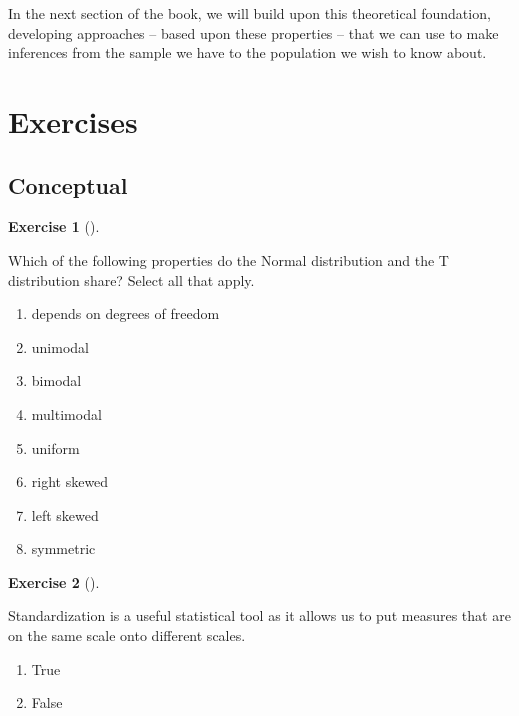 \documentclass[
  letterpaper,
  DIV=11,
  numbers=noendperiod]{scrreprt}
\providecommand{\tightlist}{%
  \setlength{\itemsep}{0pt}\setlength{\parskip}{0pt}}\usepackage{longtable,booktabs,array}
\theoremstyle{definition}
\newtheorem{exercise}{Exercise}[chapter]
\theoremstyle{remark}
\begin{document}
In the next section of the book, we will build upon this theoretical
foundation, developing approaches -- based upon these properties -- that
we can use to make inferences from the sample we have to the population
we wish to know about.

\hypertarget{sec-ex09}{%
\section{Exercises}\label{sec-ex09}}

\hypertarget{sec-ex09-conceptual}{%
\subsection{Conceptual}\label{sec-ex09-conceptual}}

\begin{exercise}[]\protect\hypertarget{exr-ch09-c01}{}\label{exr-ch09-c01}

Which of the following properties do the Normal distribution and the T
distribution share? Select all that apply.

\begin{enumerate}
\def\labelenumi{\alph{enumi})}
\tightlist
\item
  depends on degrees of freedom
\item
  unimodal
\item
  bimodal
\item
  multimodal
\item
  uniform
\item
  right skewed
\item
  left skewed
\item
  symmetric
\end{enumerate}

\end{exercise}

\begin{exercise}[]\protect\hypertarget{exr-ch09-c02}{}\label{exr-ch09-c02}

Standardization is a useful statistical tool as it allows us to put
measures that are on the same scale onto different scales.

\begin{enumerate}
\def\labelenumi{\alph{enumi})}
\tightlist
\item
  True
\item
  False
\end{enumerate}

\end{exercise}
\end{document}
